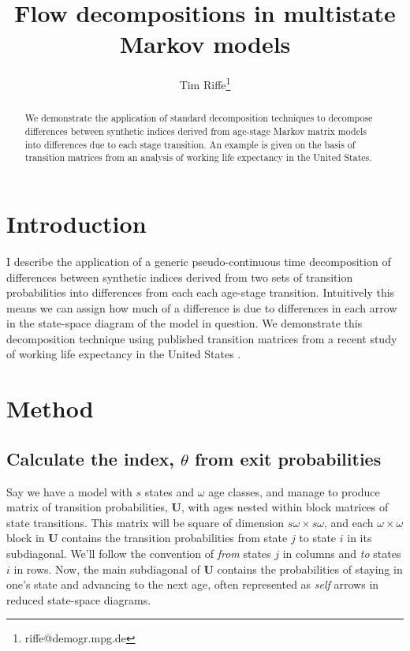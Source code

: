 \documentclass{article}
\begin{document}
\title{Flow decompositions in multistate Markov models}
\author[1]{Tim Riffe\thanks{riffe@demogr.mpg.de}}
\maketitle

\begin{abstract}
We demonstrate the application of standard decomposition techniques to decompose
differences between synthetic indices derived from age-stage Markov matrix
models into differences due to each stage transition. An example is given on the basis
of transition matrices from an analysis of working life expectancy in the
United States.
\end{abstract}

\section{Introduction}
I describe the application of a generic pseudo-continuous time decomposition
\citep{horiuchi2008} of differences between synthetic indices derived from two
sets of transition probabilities into differences from each each age-stage transition. Intuitively this means
we can assign how much of a difference is due to differences in each arrow in
the state-space diagram of the model in question. We demonstrate this
decomposition technique using published transition matrices from a recent study
of working life expectancy in the United States \citep{Dudel2017}.

\section{Method}
\subsection{Calculate the index, $\theta$ from exit probabilities}
Say we have a model with $s$ states and $\omega$ age classes, and manage to
produce matrix of transition probabilities, $\textbf{U}$, with ages nested
within block matrices of state transitions. This matrix will be square of
dimension $s\omega \times s\omega$, and each $\omega \times \omega$ block in
$\textbf{U}$ contains the transition probabilities from state $j$ to state $i$
in its subdiagonal. We'll follow the convention of \emph{from} states $j$ in
columns and \emph{to} states $i$ in rows. Now,
the main subdiagonal of $\textbf{U}$ contains the probabilities of staying in
one's state and advancing to the next age, often represented as
\emph{self} arrows in reduced state-space diagrams. 
\end{document}
